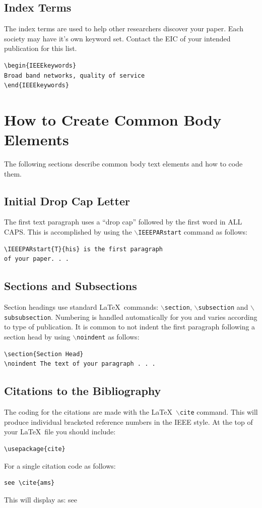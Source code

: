 \documentclass[lettersize,journal]{IEEEtran} %
\begin{document}
\subsection{Index Terms}
\noindent The index terms are used to help other researchers discover your paper. Each society may have it's own keyword set. Contact the EIC of your intended publication for this list.
\begin{verbatim}
\begin{IEEEkeywords}
Broad band networks, quality of service
\end{IEEEkeywords}
\end{verbatim}
\section{How to Create Common Body Elements}
\noindent The following sections describe common body text elements and how to code them.

\subsection{Initial Drop Cap Letter}
\noindent The first text paragraph uses a ``drop cap'' followed by the first word in ALL CAPS. This is accomplished by using the $\backslash${\tt{IEEEPARstart}} command as follows:
\begin{verbatim}
\IEEEPARstart{T}{his} is the first paragraph 
of your paper. . .
\end{verbatim}

\subsection{Sections and Subsections}
\noindent Section headings use standard \LaTeX\ commands: $\backslash${\tt{section}}, $\backslash${\tt{subsection}} and $\backslash${\tt{subsubsection}}. Numbering is handled automatically for you and varies according to type of publication. It is common to not indent the first paragraph following a section head by using $\backslash${\tt{noindent}} as follows:
\begin{verbatim}
\section{Section Head}
\noindent The text of your paragraph . . .
\end{verbatim}

\subsection{Citations to the Bibliography}
\noindent The coding for the citations are made with the \LaTeX\ $\backslash${\tt{cite}} command. This will produce individual bracketed reference numbers in the IEEE style. At the top of your \LaTeX\ file you should include:
\begin{verbatim}
\usepackage{cite}
\end{verbatim}
For a single citation code as follows:
\begin{verbatim}
see \cite{ams}
\end{verbatim}
This will display as: see \cite{ams}\\
\end{document}

